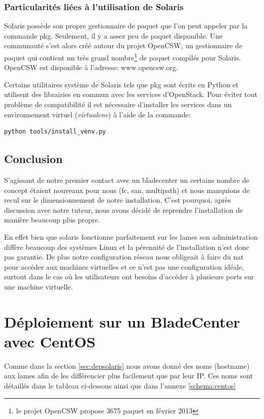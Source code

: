 \documentclass[a4paper,oneside]{report}
\begin{document}
\subsubsection{Particularités liées à l'utilisation de Solaris}
Solaris possède son propre gestionnaire de paquet que l'on peut appeler par la commande pkg. Seulement, il y a assez peu de paquet disponible. Une communauté s'est alors créé autour du projet OpenCSW, un gestionnaire de paquet qui contient un très grand nombre\footnote{le projet OpenCSW propose 3675 paquet en février 2013} de paquet compilés pour Solaris. OpenCSW est disponible à l'adresse: www.opencsw.org.

Certains utilitaires système de Solaris tels que pkg sont écrits en Python et utilisent des librairies en commun avec les services d'OpenStack. Pour éviter tout problème de compatibilité il est nécessaire d'installer les services dans un environnement virtuel (\emph{virtualenv}) à l'aide de la commande:
\begin{verbatim}
python tools/install_venv.py
\end{verbatim}

\subsection{Conclusion}
S'agissant de notre premier contact avec un \gls{bladecenter} un certains nombre de concept étaient nouveaux pour nous (\gls{fc}, \gls{san}, multipath) et nous manquions de recul sur le dimensionnement de notre installation.
C'est pourquoi, après discussion avec notre tuteur, nous avons décidé de reprendre l'installation de manière beaucoup plus propre.

En effet bien que \gls{solaris} fonctionne parfaitement sur les lames son administration diffère beaucoup des systèmes Linux et la pérennité de l'installation n'est donc pas garantie.\newline
De plus notre configuration réseau nous obligeait à faire du \gls{nat} pour accéder aux machines virtuelles et ce n'est pas une configuration idéale, surtout dans le cas où les utilisateurs ont besoins d'accéder à plusieurs ports sur une machine virtuelle.


\section{Déploiement sur un BladeCenter avec CentOS} \label{sec:depblade}
Comme dans la section \ref{sec:depsolaris} nous avons donné des noms (hostname) aux lames afin de les différencier plus facilement que par leur IP.
Ces noms sont détaillés dans le tableau ci-dessous ainsi que dans l'annexe \ref{schema:centos}
\end{document}
